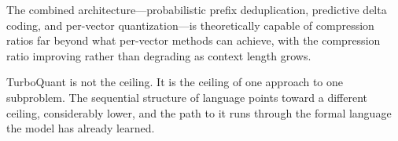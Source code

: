 \documentclass[11pt]{article}
\begin{document}
The combined architecture---probabilistic prefix deduplication, predictive delta
coding, and per-vector quantization---is theoretically capable of compression
ratios far beyond what per-vector methods can achieve, with the compression ratio
improving rather than degrading as context length grows.

TurboQuant is not the ceiling.  It is the ceiling of one approach to one
subproblem.  The sequential structure of language points toward a different ceiling,
considerably lower, and the path to it runs through the formal language the model
has already learned.



\end{document}
